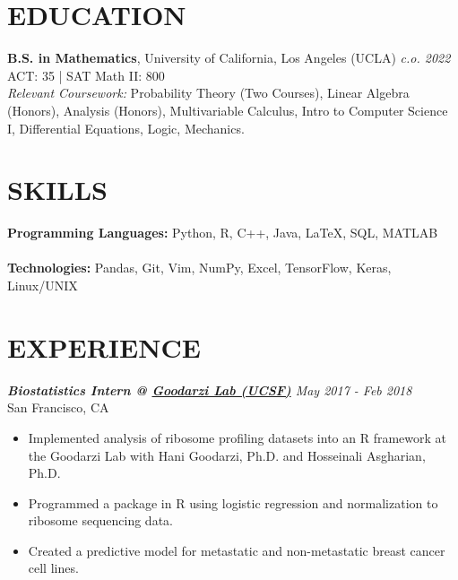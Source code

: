 \documentclass[margin, 10pt]{res} %
\begin{document}
\begin{resume}


\section{\large EDUCATION}

{\bf B.S. in Mathematics}, University of California, Los Angeles (UCLA) \hfill{\sl c.o. 2022}\\
ACT: 35 | SAT Math II: 800\\
{\sl Relevant Coursework:} Probability Theory (Two Courses), Linear Algebra (Honors), Analysis (Honors), Multivariable Calculus, Intro to Computer Science I, Differential Equations, Logic, Mechanics.

\section{\large SKILLS} 

{\bf Programming Languages:} 
Python, R, C++, Java, {\LaTeX}, SQL, MATLAB \\ \\
{\bf Technologies:}
Pandas, Git, Vim, NumPy, Excel, TensorFlow, Keras, Linux/UNIX
 
\section{\large EXPERIENCE}

{\sl {\bf Biostatistics Intern @ \href {https://goodarzilab.ucsf.edu/}{Goodarzi Lab (UCSF)}} \hfill May 2017 - Feb 2018} \\
San Francisco, CA

\begin{itemize} \itemsep -1pt %
\item Implemented analysis of ribosome profiling datasets into an R framework at the Goodarzi Lab with Hani Goodarzi, Ph.D. and Hosseinali Asgharian, Ph.D.
\item Programmed a package in R using logistic regression and normalization to ribosome sequencing data.
\item Created a predictive model for metastatic and non-metastatic breast cancer cell lines.
\end{itemize}
 

\end{resume}
\end{document}
